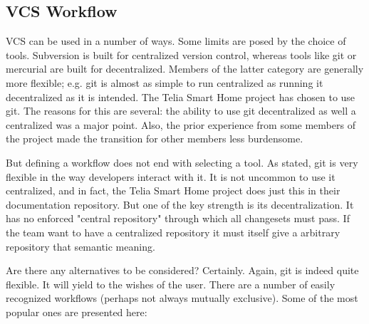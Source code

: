 \documentclass{article}
\begin{document}
%
%
%

\subsection{VCS Workflow}

VCS can be used in a number of ways. Some limits are posed by the choice
of tools. Subversion is built for centralized version control, whereas
tools like git or mercurial are built for decentralized. Members of the 
latter category are generally more flexible; e.g. git is almost as simple 
to run centralized as running it decentralized as it is intended. The 
Telia Smart Home project has chosen to use git. The reasons for this are
several: the ability to use git decentralized as well a centralized was a
major point. Also, the prior experience from some members of the project
made the transition for other members less burdensome.

But defining a workflow does not end with selecting a tool. As stated, 
git is very flexible in the way developers interact with it. It is not
uncommon to use it centralized, and in fact, the Telia Smart Home project
does just this in their documentation repository. But one of the key 
strength is its decentralization. It has no enforced "central repository"
through which all changesets must pass. If the team want to have a 
centralized repository it must itself give a arbitrary repository that
semantic meaning.

Are there any alternatives to be considered? Certainly. Again, git is 
indeed quite flexible. It will yield to the wishes of the user. There are 
a number of easily recognized workflows (perhaps not always mutually
exclusive). Some of the most popular ones are presented here:
\end{document}
